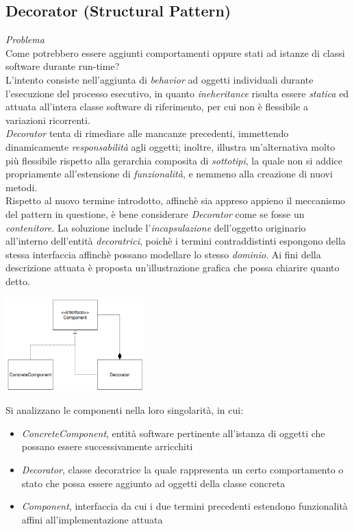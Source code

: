 \documentclass{article}
\begin{document}
\subsection*{Decorator (Structural Pattern)}
\large
\textit{Problema}\\
Come potrebbero essere aggiunti comportamenti oppure stati ad istanze di classi software durante run-time?\vspace*{14pt}\\
L'intento consiste nell'aggiunta di \textit{behavior} ad oggetti individuali durante l'esecuzione del processo esecutivo, in quanto \textit{ineheritance} risulta essere \textit{statica} ed attuata all'intera classe software di riferimento, per cui non è flessibile a variazioni ricorrenti.\vspace*{7pt}\\
\textit{Decorator} tenta di rimediare alle mancanze precedenti, immettendo dinamicamente \textit{responsabilità} agli oggetti; inoltre, illustra un'alternativa molto più flessibile rispetto alla gerarchia composita di \textit{sottotipi}, la quale non si addice propriamente all'estensione di \textit{funzionalità}, e nemmeno alla creazione di nuovi metodi.\vspace*{7pt}\\
Rispetto al nuovo termine introdotto, affinchè sia appreso appieno il meccanismo del pattern in questione, è bene considerare \textit{Decorator} come se fosse un \textit{contenitore}. La soluzione include l'\textit{incapsulazione} dell'oggetto originario all'interno dell'entità \textit{decoratrici}, poichè i termini contraddistinti espongono della stessa interfaccia affinchè possano modellare lo stesso \textit{dominio}. Ai fini della descrizione attuata è proposta un'illustrazione grafica che possa chiarire quanto detto.
\begin{center}
    \includegraphics[width=0.4\textwidth]{foto 5.png}
\end{center} 
Si analizzano le componenti nella loro singolarità, in cui:
\begin{itemize}[label={-}]
    \itemsep0em
    \item \textit{ConcreteComponent}, entità software pertinente all'istanza di oggetti che possano essere successivamente arricchiti  
    \item \textit{Decorator}, classe decoratrice la quale rappresenta un certo comportamento o stato che possa essere aggiunto ad oggetti della classe concreta 
    \item \textit{Component}, interfaccia da cui i due termini precedenti estendono funzionalità affini all'implementazione attuata
\end{itemize}
\end{document}
